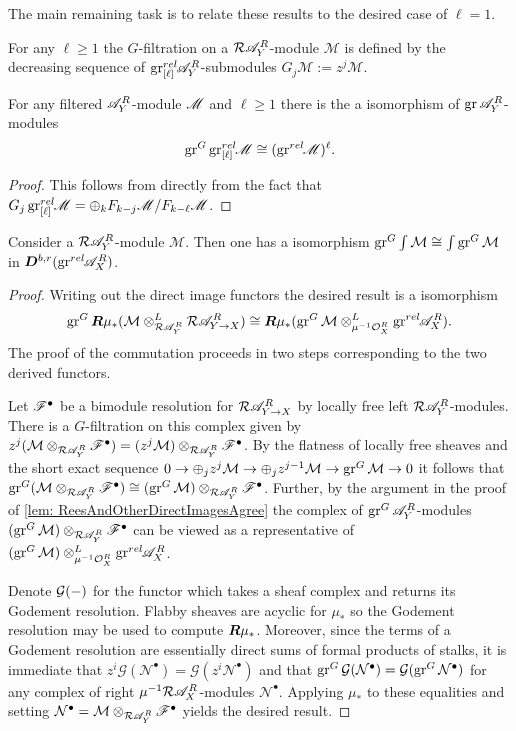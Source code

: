 The main remaining task is to relate these results to the desired case of $\ell = 1$.
\begin{definition}
  For any $\ell \geq 1$ the $G$-filtration on a $\mathcal{R}\mathscr{A}_Y^R$-module $\mathcal{M}$ is defined by the decreasing sequence of $\operatorname{gr}_{[\ell]}^{rel}\mkern-5mu\mathscr{A}_Y^R$-submodules $G_j \mathcal{M} := z^{j}\mathcal{M}$.
\end{definition}
\begin{lemma}\label{lem: GradedGGradedLYieldsGraded}
  For any filtered $\mathscr{A}_Y^R$-module $\mathscr{M}$ and $\ell \geq 1$ there is the a isomorphism of $\operatorname{gr} \mathscr{A}_Y^R$-modules
  $$\operatorname{gr}^G \operatorname{gr}_{[\ell]}^{rel}\mkern-5mu \mathscr{M} \cong (\operatorname{gr}^{rel}\mkern-5mu\mathscr{M})^\ell.$$
\end{lemma}
\begin{proof}
  This follows from directly from the fact that $G_j\operatorname{gr}_{[\ell]}^{rel}\mkern-5mu\mathscr{M} = \oplus_k F_{k-j}\mathscr{M} /F_{k-\ell}\mathscr{M}$.
\end{proof}
\begin{lemma}\label{lem: grGCommutes}
  Consider a $\mathcal{R}\mathscr{A}_Y^R$-module $\mathcal{M}$. Then one has a isomorphism $\operatorname{gr}^G\int\mathcal{M} \cong \int\operatorname{gr}^G\mathcal{M}$ in $\boldsymbol{D}^{b,r}(\operatorname{gr}^{rel}\mkern-5mu\mathscr{A}_X^R)$.
\end{lemma}
\begin{proof}
  Writing out the direct image functors the desired result is a isomorphism $$\operatorname{gr}^G\boldsymbol{R}\mu_*(\mathcal{M}\otimes^L_{\mathcal{R}\mathscr{A}_Y^R} \mathcal{R}\mathscr{A}_{Y\to X}^R)  \cong \boldsymbol{R}\mu_*(\operatorname{gr}^G\mathcal{M}\otimes^L_{\mu^{-1}\mathcal{O}_X^R}\operatorname{gr}^{rel}\mkern-5mu\mathscr{A}_X^R).$$
  The proof of the commutation proceeds in two steps corresponding to the two derived functors.

  Let $\mathscr{F}^\bullet$ be a bimodule resolution for $\mathcal{R}\mathscr{A}_{Y\to X}^R$ by locally free left $\mathcal{R} \mathscr{A}_Y^R$-modules.
  There is a $G$-filtration on this complex given by $z^j(\mathcal{M}\otimes_{\mathcal{R}\mathscr{A}_Y^R} \mathscr{F}^\bullet) = (z^j\mathcal{M})\otimes_{\mathcal{R}\mathscr{A}_Y^R} \mathscr{F}^\bullet$.
  By the flatness of locally free sheaves and the short exact sequence $0\to \oplus_j z^j \mathcal{M} \to \oplus_j z^{j-1}\mathcal{M} \to \operatorname{gr}^G \mathcal{M} \to 0$ it follows that $\operatorname{gr}^G(\mathcal{M}\otimes_{\mathcal{R}\mathscr{A}_Y^R} \mathscr{F}^\bullet) \cong (\operatorname{gr}^G\mathcal{M})\otimes_{\mathcal{R}\mathscr{A}_Y^R} \mathscr{F}^\bullet$.
  Further, by the argument in the proof of \cref{lem: ReesAndOtherDirectImagesAgree} the complex of $\operatorname{gr}^G\mathscr{A}_Y^R$-modules  $(\operatorname{gr}^G\mathcal{M})\otimes_{\mathcal{R}\mathscr{A}_Y^R} \mathscr{F}^\bullet$ can be viewed as a representative of $(\operatorname{gr}^G\mathcal{M})\otimes^L_{\mu^{-1}\mathcal{O}_X^R}\operatorname{gr}^{rel}\mkern-5mu\mathscr{A}_X^R$.

  Denote $\mathcal{G}({-})$ for the functor which takes a sheaf complex and returns its Godement resolution.
  Flabby sheaves are acyclic for $\mu_*$ so the Godement resolution may be used to compute $\boldsymbol{R}\mu_*$.
  Moreover, since the terms of a Godement resolution are essentially direct sums of formal products of stalks, it is immediate that $z^i \mathcal{G}(\mathcal{N}^\bullet) = \mathcal{G}(z^i\mathcal{N}^\bullet)$ and that $\operatorname{gr}^G\mathcal{G}(\mathcal{N}^\bullet) =\mathcal{G}(\operatorname{gr}^G\mathcal{N}^\bullet)$ for any complex of right $\mu^{-1}\mathcal{R}\mathscr{A}_X^R$-modules $\mathcal{N}^\bullet$.
  Applying $\mu_*$ to these equalities and setting $\mathcal{N}^\bullet = \mathcal{M}\otimes_{\mathcal{R}\mathscr{A}_Y^R} \mathscr{F}^\bullet$ yields the desired result.
\end{proof}
